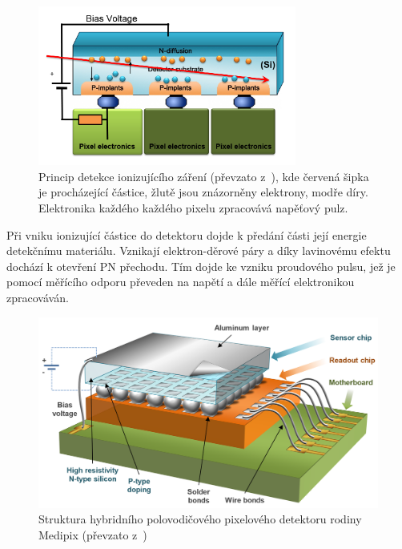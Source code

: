 \begin{figure}[th]
	\begin{center}
		\includegraphics[width=8.5cm]{figures/det_recombination.png}
		\caption{Princip detekce ionizujícího záření (převzato z~\cite{PlatkevicDisertace}), kde červená šipka je procházející částice, žlutě jsou znázorněny elektrony, modře díry. Elektronika každého každého pixelu zpracovává napěťový pulz.}
		\label{fig:det:recomb}
	\end{center}
\end{figure}
Při vniku ionizující částice do detektoru dojde k předání části její energie detekčnímu materiálu. Vznikají elektron-děrové páry a díky lavinovému efektu dochází k otevření PN přechodu. Tím dojde ke vzniku proudového pulsu, jež je pomocí měřícího odporu převeden na napětí a dále měřící elektronikou zpracováván.

\begin{figure}[th]
	\begin{center}
		\includegraphics[width=12cm]{figures/det_chip.png}
		\caption{Struktura hybridního polovodičového pixelového detektoru rodiny Medipix (převzato z~\cite{PlatkevicDisertace})}
		\label{fig:det:chip}
	\end{center}
\end{figure}

